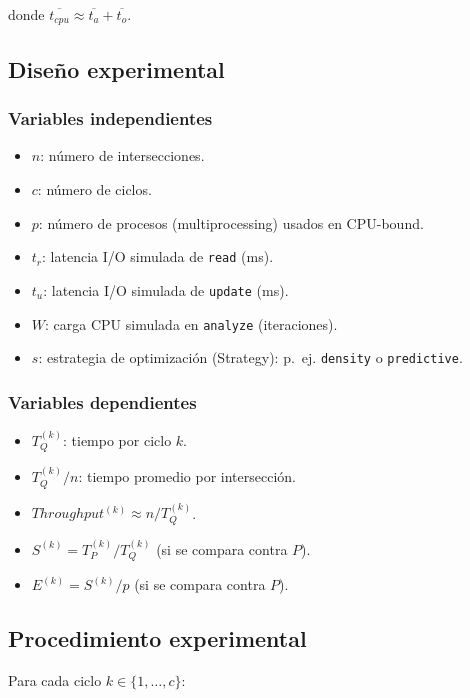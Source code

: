 \documentclass[12pt]{article}
\begin{document}
donde \(\overline{t_{cpu}} \approx \overline{t_a}+\overline{t_o}\).

\subsection{Diseño experimental}

\subsubsection{Variables independientes}

\begin{itemize}
\item \(n\): número de intersecciones.
\item \(c\): número de ciclos.
\item \(p\): número de procesos (multiprocessing) usados en CPU-bound.
\item \(t_r\): latencia I/O simulada de \texttt{read} (ms).
\item \(t_u\): latencia I/O simulada de \texttt{update} (ms).
\item \(W\): carga CPU simulada en \texttt{analyze} (iteraciones).
\item \(s\): estrategia de optimización (Strategy): p.\ ej. \texttt{density} o \texttt{predictive}.
\end{itemize}

\subsubsection{Variables dependientes}

\begin{itemize}
\item \(T_Q^{(k)}\): tiempo por ciclo \(k\).
\item \(T_Q^{(k)}/n\): tiempo promedio por intersección.
\item \(Throughput^{(k)} \approx n/T_Q^{(k)}\).
\item \(S^{(k)}=T_P^{(k)}/T_Q^{(k)}\) (si se compara contra \(P\)).
\item \(E^{(k)}=S^{(k)}/p\) (si se compara contra \(P\)).
\end{itemize}

\subsection{Procedimiento experimental}

Para cada ciclo \(k\in\{1,\dots,c\}\):
\end{document}

